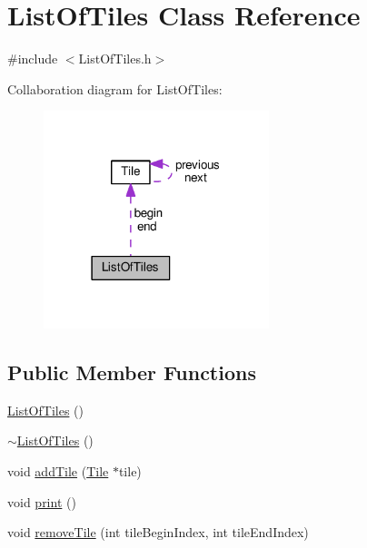 \hypertarget{classListOfTiles}{\section{List\+Of\+Tiles Class Reference}
\label{classListOfTiles}
}


{\ttfamily \#include $<$List\+Of\+Tiles.\+h$>$}



Collaboration diagram for List\+Of\+Tiles\+:\nopagebreak
\begin{figure}[H]
\begin{center}
\leavevmode
\includegraphics[width=186pt]{classListOfTiles__coll__graph}
\end{center}
\end{figure}
\subsection*{Public Member Functions}
\begin{DoxyCompactItemize}
\item 
\hyperlink{classListOfTiles_ad87132d4a7c3eb474797f3e3be24232c}{List\+Of\+Tiles} ()
\item 
\hyperlink{classListOfTiles_aff2ecd909d48a815199b949f0a0556cc}{$\sim$\+List\+Of\+Tiles} ()
\item 
void \hyperlink{classListOfTiles_a0d8226cb5174084dd6bc7d8854c1e3aa}{add\+Tile} (\hyperlink{classTile}{Tile} $\ast$tile)
\item 
void \hyperlink{classListOfTiles_a72a1b46b241ee17dc6f6ff9e5f291521}{print} ()
\item 
void \hyperlink{classListOfTiles_ac824d0c735f0f975663740da8d827511}{remove\+Tile} (int tile\+Begin\+Index, int tile\+End\+Index)
\end{DoxyCompactItemize}
